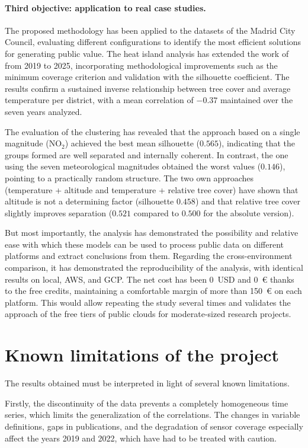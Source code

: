 \paragraph{Third objective: application to real case studies.}
The proposed methodology has been applied to the datasets of the Madrid City Council, evaluating different configurations to identify the most efficient solutions for generating public value. The heat island analysis has extended the work of \citep{Meneses2023Madrid} from 2019 to 2025, incorporating methodological improvements such as the minimum coverage criterion and validation with the silhouette coefficient. The results confirm a sustained inverse relationship between tree cover and average temperature per district, with a mean correlation of $-0.37$ maintained over the seven years analyzed.

The evaluation of the clustering has revealed that the approach based on a single magnitude (NO$_2$) achieved the best mean silhouette ($0.565$), indicating that the groups formed are well separated and internally coherent. In contrast, the one using the seven meteorological magnitudes obtained the worst values ($0.146$), pointing to a practically random structure. The two own approaches (temperature + altitude and temperature + relative tree cover) have shown that altitude is not a determining factor (silhouette $0.458$) and that relative tree cover slightly improves separation ($0.521$ compared to $0.500$ for the absolute version).

But most importantly, the analysis has demonstrated the possibility and relative ease with which these models can be used to process public data on different platforms and extract conclusions from them. Regarding the cross-environment comparison, it has demonstrated the reproducibility of the analysis, with identical results on local, AWS, and GCP. The net cost has been 0~USD and 0~€ thanks to the free credits, maintaining a comfortable margin of more than 150~€ on each platform. This would allow repeating the study several times and validates the approach of the free tiers of public clouds for moderate-sized research projects.

\section{Known limitations of the project}

The results obtained must be interpreted in light of several known limitations.

Firstly, the discontinuity of the data prevents a completely homogeneous time series, which limits the generalization of the correlations. The changes in variable definitions, gaps in publications, and the degradation of sensor coverage especially affect the years 2019 and 2022, which have had to be treated with caution.

